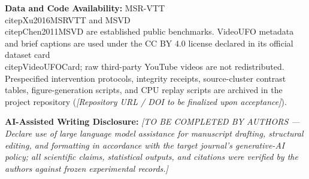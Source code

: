 \documentclass[11pt,a4paper]{article}
\begin{document}
\textbf{Data and Code Availability:} MSR-VTT \\citep{Xu2016MSRVTT} and MSVD \\citep{Chen2011MSVD} are established public benchmarks. VideoUFO metadata and brief captions are used under the CC BY 4.0 license declared in its official dataset card \\citep{VideoUFOCard}; raw third-party YouTube videos are not redistributed. Prespecified intervention protocols, integrity receipts, source-cluster contrast tables, figure-generation scripts, and CPU replay scripts are archived in the project repository (\emph{[Repository URL / DOI to be finalized upon acceptance]}).

\textbf{AI-Assisted Writing Disclosure:} \emph{[TO BE COMPLETED BY AUTHORS --- Declare use of large language model assistance for manuscript drafting, structural editing, and formatting in accordance with the target journal's generative-AI policy; all scientific claims, statistical outputs, and citations were verified by the authors against frozen experimental records.]}



\end{document}
